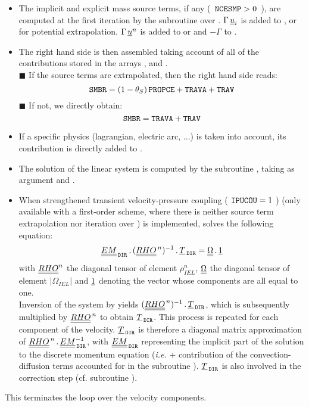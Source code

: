 \begin{itemize}
\item The implicit and explicit mass source terms, if any (~$\text{\texttt{NCESMP}}>0$~), are computed at the first iteration by the subroutine   over . $\Gamma\,\underline{u}_i$ is added to ,  or  for potential extrapolation. $\Gamma\,\underline{u}^n$ is added to  or  and
$-\Gamma$ to .
\\
\item The right hand side is then assembled taking account of all of the
contributions stored in the arrays ,  and
.\\
{\tiny$\blacksquare$} If the source terms are extrapolated, then the right hand side reads:
$$\text{\texttt{SMBR}}=(1-\theta_S)\,\text{\texttt{PROPCE}}+\text{\texttt{TRAVA}}+\text{\texttt{TRAV}}$$
{\tiny$\blacksquare$} If not, we directly obtain:
$$\text{\texttt{SMBR}}=\text{\texttt{TRAVA}}+\text{\texttt{TRAV}}$$

\item If a specific physics (lagrangian, electric arc, ...) is taken into account, its contribution is directly added to .
\\
\item The solution of the linear system is computed by the subroutine
, taking as argument  and .\\

\item When strengthened transient velocity-pressure coupling ($\ \text{\texttt{IPUCOU}} = 1\ $) (only available with a first-order scheme, where there is neither source term extrapolation nor iteration over ) is implemented,  solves the following equation:
\begin{equation}\label{Base_Predvv_Eq_Tdir}
\underline{\underline{EM}}_{\,\text{\texttt{DIR}}}\,.\, (\underline{\underline{RHO}}^{\,n})^{-1}\,.\,\underline{T}_{\,\text{\texttt{DIR}}} =
\underline{\underline{\Omega}}\,.\,\underline{1}
\end{equation}
with $\underline{\underline{RHO}}^n$ the diagonal tensor of element $\rho^{n}_{IEL}$,
$\underline{\underline{\Omega}}$ the diagonal tensor of element $|\Omega_{IEL}|$ and $\underline{1}$ denoting the
vector whose components are all equal to one.\\
Inversion of the system by  yields
$(\underline{\underline{RHO}}^{\,n})^{-1}\,.\,\underline{T}_{\,\text{\texttt{DIR}}}$, which is subsequently multiplied by $\underline{\underline{RHO}}^{\,n}$
to obtain $\underline{T}_{\,\text{\texttt{DIR}}}$.
This process is repeated for each component  of the velocity. $\underline{T}_{\,\text{\texttt{DIR}}}$
is therefore a diagonal matrix approximation of
$\underline{\underline{RHO}}^{\,n}\,.\,\underline{\underline{EM}}_{\,\text{\texttt{DIR}}}^{-1}$, with
$\underline{\underline{EM}}_{\,\text{\texttt{DIR}}}$ representing the implicit part of the solution to the discrete momentum equation (\emph{i.e.}  + contribution of the convection-diffusion terms accounted for in the subroutine
). $\underline{T}_{\,\text{\texttt{DIR}}}$ is also involved in the correction step (cf. subroutine ).\\
\end{itemize}
This terminates the loop over the velocity components.\\

